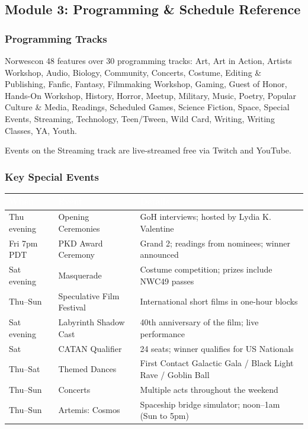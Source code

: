 \documentclass[11pt,letterpaper]{article}
\newcommand{\tableheader}[1]{\textbf{\sffamily\textcolor{white}{#1}}}
\begin{document}
\subsection{Module 3: Programming \& Schedule Reference}

\subsubsection{Programming Tracks}

Norwescon 48 features over 30 programming tracks: Art, Art in Action, Artists Workshop, Audio, Biology, Community, Concerts, Costume, Editing \& Publishing, Fanfic, Fantasy, Filmmaking Workshop, Gaming, Guest of Honor, Hands-On Workshop, History, Horror, Meetup, Military, Music, Poetry, Popular Culture \& Media, Readings, Scheduled Games, Science Fiction, Space, Special Events, Streaming, Technology, Teen/Tween, Wild Card, Writing, Writing Classes, YA, Youth.

Events on the Streaming track are live-streamed free via Twitch and YouTube.

\subsubsection{Key Special Events}

\begin{center}
\begin{tabularx}{\textwidth}{L{2cm}L{3cm}X}
\toprule
{}
\tableheader{When} & \tableheader{Event} & \tableheader{Details} \\
\midrule
Thu evening & Opening Ceremonies & GoH interviews; hosted by Lydia K. Valentine \\
Fri 7pm PDT & PKD Award Ceremony & Grand 2; readings from nominees; winner announced \\
Sat evening & Masquerade & Costume competition; prizes include NWC49 passes \\
Thu--Sun & Speculative Film Festival & International short films in one-hour blocks \\
Sat evening & Labyrinth Shadow Cast & 40th anniversary of the film; live performance \\
Sat & CATAN Qualifier & 24 seats; winner qualifies for US Nationals \\
Thu--Sat & Themed Dances & First Contact Galactic Gala / Black Light Rave / Goblin Ball \\
Thu--Sun & Concerts & Multiple acts throughout the weekend \\
Thu--Sun & Artemis: Cosmos & Spaceship bridge simulator; noon--1am (Sun to 5pm) \\
\bottomrule
\end{tabularx}
\end{center}
\end{document}
